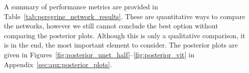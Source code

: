 A summary of performance metrics are provided in Table~\ref{tab:peregrine_network_results}. These are quantitative ways to compare the networks, however we still cannot conclude the best option without comparing the posterior plots. Although this is only a qualitative comparison, it is in the end, the most important element to consider. The posterior plots are given in Figures~\ref{fig:posterior_unet_half}--\ref{fig:posterior_vit} in Appendix~\ref{sec:apx:posterior_plots}.



